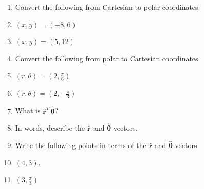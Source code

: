 \documentclass[M3_Night5_Solutions]{subfiles}
\begin{document}
\begin{enumerate}[resume=exercises, label=\textbf{Exercise} (\arabic*)]

\item Convert the following from Cartesian to polar coordinates.
\be
\item $(x,y) = \left(-8, 6\right)$
\item $(x,y) = \left(5, 12\right)$
\ee


\item Convert the following from polar to Cartesian coordinates.
\be
\item $(r, \theta) = \left(2, \frac{\pi}{6}\right)$
\item $(r, \theta) = \left(2, -\frac{\pi}{3}\right)$
\ee



\item What is $\hat{\mathbf{r}}^T \, \hat{\boldsymbol{\theta}} $?

\item In words, describe the $\hat{\mathbf{r}}$ and $\hat{\boldsymbol{\theta}}$ vectors.


\item Write the following points in terms of the $\hat{\mathbf{r}}$ and $\hat{\boldsymbol{\theta}}$ vectors
\be
\item $(4,3)$.
\item $\left(3, \frac{\pi}{3}\right)$
\ee


\end{enumerate}
\end{document}
